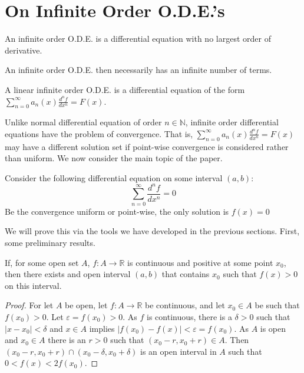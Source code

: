     \section{On Infinite Order O.D.E.'s}
        \begin{definition}
        An infinite order O.D.E. is a differential equation with no largest order of derivative.
        \end{definition}
        An infinite order O.D.E. then necessarily has an infinite number of terms.
        \begin{definition}
        A linear infinite order O.D.E. is a differential equation of the form $\sum_{n=0}^{\infty} a_n(x) \frac{d^n f}{dx^n} = F(x)$.
        \end{definition}
        Unlike normal differential equation of order $n\in \mathbb{N}$, infinite
        order differential equations have the problem of convergence. That is,
        $\sum_{n=0}^{\infty} a_n(x) \frac{d^n f}{dx^n} = F(x)$ may have a
        different solution set if point-wise convergence is considered rather
        than uniform.
        We now consider the main topic of the paper.
        \begin{theorem}
        Consider the following differential equation on some interval $(a,b)$:
        \begin{equation}
        \nonumber \sum_{n=0}^{\infty} \frac{d^n f}{dx^n} = 0
        \end{equation}
        Be the convergence uniform or point-wise, the only solution is $f(x)=0$
        \end{theorem}
        We will prove this via the tools we have developed in the previous sections. First, some preliminary results.
        \begin{theorem}
        If, for some open set $A$, $f:A\rightarrow \mathbb{R}$ is continuous and positive at some point $x_0$, then there exists and open interval $(a,b)$ that contains $x_0$ such that $f(x)>0$ on this interval.
        \end{theorem}
        \begin{proof}
        For let $A$ be open, let $f:A\rightarrow \mathbb{R}$ be continuous, and let $x_0\in A$ be such that $f(x_0)>0$. Let $\varepsilon = f(x_0)>0$. As $f$ is continuous, there is a $\delta>0$ such that $|x-x_0|<\delta$ and $x\in A$ implies $|f(x_0)-f(x)|<\varepsilon = f(x_0)$. As $A$ is open and $x_0\in A$ there is an $r>0$ such that $(x_0-r,x_0+r)\in A$. Then $(x_0-r,x_0+r)\cap (x_0-\delta,x_0+\delta)$ is an open interval in $A$ such that $0<f(x)<2f(x_0)$.
        \end{proof}

